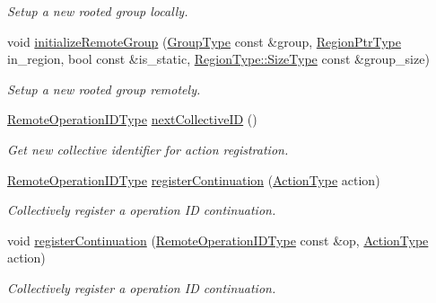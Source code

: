 \begin{DoxyCompactItemize}
\begin{DoxyCompactList}\small\item\em Setup a new rooted group locally. \end{DoxyCompactList}\item 
void \hyperlink{structvt_1_1group_1_1_group_manager_a7222ca8746603129c0c014a4559594e9}{initialize\+Remote\+Group} (\hyperlink{namespacevt_a27b5e4411c9b6140c49100e050e2f743}{Group\+Type} const \&group, \hyperlink{structvt_1_1group_1_1_group_manager_a9192e585fc2f99bfd5a6ff65fc21c40b}{Region\+Ptr\+Type} in\+\_\+region, bool const \&is\+\_\+static, \hyperlink{structvt_1_1group_1_1region_1_1_region_a9bb381adf31111aae34dbc644bad6c1f}{Region\+Type\+::\+Size\+Type} const \&group\+\_\+size)
\begin{DoxyCompactList}\small\item\em Setup a new rooted group remotely. \end{DoxyCompactList}\item 
\hyperlink{namespacevt_1_1group_a73f2624ddeb535b39a08b6524f26b244}{Remote\+Operation\+I\+D\+Type} \hyperlink{structvt_1_1group_1_1_group_manager_ae8ccd9feb60fcd1ee85cc1f09ed003fb}{next\+Collective\+ID} ()
\begin{DoxyCompactList}\small\item\em Get new collective identifier for action registration. \end{DoxyCompactList}\item 
\hyperlink{namespacevt_1_1group_a73f2624ddeb535b39a08b6524f26b244}{Remote\+Operation\+I\+D\+Type} \hyperlink{structvt_1_1group_1_1_group_manager_aebb439bebdefc27cfa6408e5cf0f7741}{register\+Continuation} (\hyperlink{namespacevt_ae0a5a7b18cc99d7b732cb4d44f46b0f3}{Action\+Type} action)
\begin{DoxyCompactList}\small\item\em Collectively register a operation ID continuation. \end{DoxyCompactList}\item 
void \hyperlink{structvt_1_1group_1_1_group_manager_a7ce9aaa7a143c8c919ac68c866917dd2}{register\+Continuation} (\hyperlink{namespacevt_1_1group_a73f2624ddeb535b39a08b6524f26b244}{Remote\+Operation\+I\+D\+Type} const \&op, \hyperlink{namespacevt_ae0a5a7b18cc99d7b732cb4d44f46b0f3}{Action\+Type} action)
\begin{DoxyCompactList}\small\item\em Collectively register a operation ID continuation. \end{DoxyCompactList}\item 

\end{DoxyCompactItemize}
